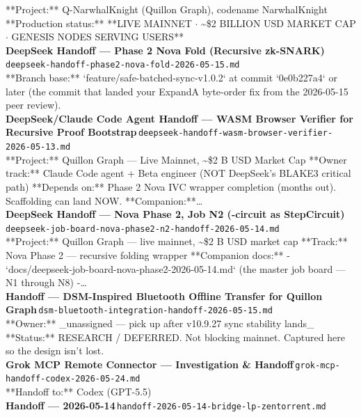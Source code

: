 \documentclass[11pt,a4paper]{article}
\begin{document}
**Project:** Q-NarwhalKnight (Quillon Graph), codename NarwhalKnight **Production status:** **LIVE MAINNET $\cdot$ \textasciitilde{}\$2 BILLION USD MARKET CAP $\cdot$ GENESIS NODES SERVING USERS**\\[6pt]
\noindent\textbf{DeepSeek Handoff --- Phase 2 Nova Fold (Recursive zk-SNARK)}\,\textcolor{qgray}{\small \texttt{deepseek-handoff-phase2-nova-fold-2026-05-15.md}}\\
**Branch base:** `feature/safe-batched-sync-v1.0.2` at commit `0e0b227a4` or later (the commit that landed your ExpandA byte-order fix from the 2026-05-15 peer review).\\[6pt]
\noindent\textbf{DeepSeek/Claude Code Agent Handoff --- WASM Browser Verifier for Recursive Proof Bootstrap}\,\textcolor{qgray}{\small \texttt{deepseek-handoff-wasm-browser-verifier-2026-05-13.md}}\\
**Project:** Quillon Graph --- Live Mainnet, \textasciitilde{}\$2 B USD Market Cap **Owner track:** Claude Code agent + Beta engineer (NOT DeepSeek's BLAKE3 critical path) **Depends on:** Phase 2 Nova IVC wrapper completion (months out). Scaffolding can land NOW. **Companion:**\ldots{}\\[6pt]
\noindent\textbf{DeepSeek Handoff --- Nova Phase 2, Job N2 (\textdelta{}-circuit as StepCircuit)}\,\textcolor{qgray}{\small \texttt{deepseek-job-board-nova-phase2-n2-handoff-2026-05-14.md}}\\
**Project:** Quillon Graph --- live mainnet, \textasciitilde{}\$2 B USD market cap **Track:** Nova Phase 2 --- recursive folding wrapper **Companion docs:** - `docs/deepseek-job-board-nova-phase2-2026-05-14.md` (the master job board --- N1 through N8) -\ldots{}\\[6pt]
\noindent\textbf{Handoff --- DSM-Inspired Bluetooth Offline Transfer for Quillon Graph}\,\textcolor{qgray}{\small \texttt{dsm-bluetooth-integration-handoff-2026-05-15.md}}\\
**Owner:** \_unassigned --- pick up after v10.9.27 sync stability lands\_ **Status:** RESEARCH / DEFERRED. Not blocking mainnet. Captured here so the design isn't lost.\\[6pt]
\noindent\textbf{Grok MCP Remote Connector --- Investigation \& Handoff}\,\textcolor{qgray}{\small \texttt{grok-mcp-handoff-codex-2026-05-24.md}}\\
**Handoff to:** Codex (GPT-5.5)\\[6pt]
\noindent\textbf{Handoff --- 2026-05-14}\,\textcolor{qgray}{\small \texttt{handoff-2026-05-14-bridge-lp-zentorrent.md}}\\
\end{document}
